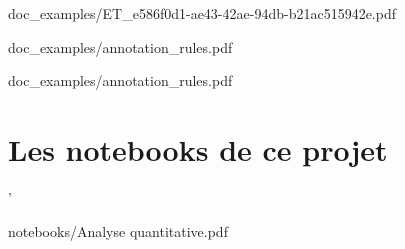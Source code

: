 \documentclass{report}
\begin{document}
        
                    {doc_examples/ET_e586f0d1-ae43-42ae-94db-b21ac515942e.pdf}

        
        {doc_examples/annotation_rules.pdf}
        
        {doc_examples/annotation_rules.pdf}

        


    \chapter{Les notebooks de ce projet}

'
        
                    {notebooks/Analyse quantitative.pdf}
        
\end{document}
